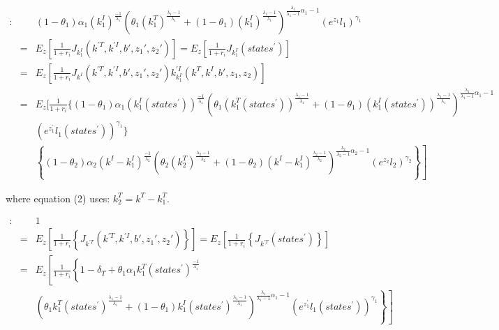 \documentclass{article}
\begin{document}
\begin{eqnarray}
     [k_1^I]: & &                                                 (1- \theta_1) \alpha_1 (k_{1}^I)^{\frac{-1}{\lambda_1}} \left( \theta_1 (k_{1}^T)^{\frac{\lambda_1-1}{\lambda_1}} +(1-\theta_1)(k_{1}^I)^{\frac{\lambda_1-1}{\lambda_1}} \right)^{\frac{\lambda_1}{\lambda_1-1}\alpha_1-1} \left( e^{z_{1}}l_{1} \right)^{\gamma_1}   \nonumber \\
     & = &  E_z\left[\frac{1}{1+r_i} J_{k_1^I}(k^{\prime T},k^{\prime I},b{\prime},z_{1}{\prime },z_{2}{\prime})   \right] = E_z\left[\frac{1}{1+r_i} J_{k_1^I}(states^\prime)   \right] \nonumber \\
     & = &  E_z\left[\frac{1}{1+r_i} J_{k^I}(k^{\prime T},k^{\prime I},b{\prime},z_{1}{\prime },z_{2}{\prime}) k_{k_1^I}^{\prime I}(k^{T},k^{I},b{\prime},z_{1},z_{2})  \right] \nonumber \\
     & = &  E_z [ \frac{1}{1+r_i} \{ (1-\theta_1) \alpha_1 (k_{1}^I(states^\prime) )^{\frac{-1}{\lambda_1}}    \left( \theta_1 (k_{1}^T(states^\prime) )^{\frac{\lambda_1-1}{\lambda_1}} +(1-\theta_1)(k_{1}^I(states^\prime) )^{\frac{\lambda_1-1}{\lambda_1}} \right)^{\frac{\lambda_1}{\lambda_1-1}\alpha_1-1} \nonumber \\
     &  &    \left( e^{z_{1}^\prime}l_{1}(states^\prime) \right)^{\gamma_1}  \}   \nonumber \\
     &  &   \left. \left\lbrace (1-\theta_2) \alpha_2 (k^I - k_{1}^I)^{\frac{-1}{\lambda_2}} \left( \theta_2 (k_{2}^T)^{\frac{\lambda_2-1}{\lambda_2}} +(1-\theta_2)(k^I - k_{1}^I)^{\frac{\lambda_2-1}{\lambda_2}} \right)^{\frac{\lambda_2}{\lambda_2-1}\alpha_2-1} \left( e^{z_{2}}l_{2} \right)^{\gamma_2} \right\rbrace  \right] \quad
\end{eqnarray}


where equation (2) uses: $ k_2^T = k^T - k_1^T$.

\begin{eqnarray}
     [k^{\prime T}]: & &   1  \nonumber \\
     & = & E_z\left[\frac{1}{1+r_i} \left\lbrace J_{k^{\prime T}}(k^{\prime T},k^{\prime I},b{\prime},z_{1}{\prime },z_{2}{\prime}) \right\rbrace   \right] = E_z\left[\frac{1}{1+r_i} \left\lbrace  J_{k^{\prime T}}(states^\prime) \right\rbrace  \right] \nonumber \\
     & = & E_z\left[ \frac{1}{1+r_i} \left\lbrace 1-\delta_T + \theta_1 \alpha_1 k_{1}^T(states^\prime)^{\frac{-1}{\lambda_1}} \right. \right. \nonumber \\
     &   &  \left. \left. \left( \theta_1 k_{1}^T(states^\prime)^{\frac{\lambda_1-1}{\lambda_1}} +(1-\theta_1)k_{1}^I(states^\prime) ^{\frac{\lambda_1-1}{\lambda_1}} \right)^{\frac{\lambda_1}{\lambda_1-1}\alpha_1-1}  \left( e^{z_{1}^\prime} l_1(states^\prime) \right)^{\gamma_1} \right\rbrace  \right] \quad \quad
\end{eqnarray}
\end{document}
